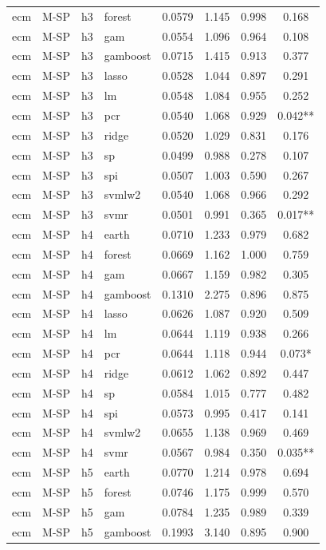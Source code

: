 \begin{ThreePartTable}
\begin{longtable}[t]{llclcccc}
ecm & M-SP & h3 & forest & 0.0579 & 1.145 & 0.998 & 0.168\\
ecm & M-SP & h3 & gam & 0.0554 & 1.096 & 0.964 & 0.108\\
ecm & M-SP & h3 & gamboost & 0.0715 & 1.415 & 0.913 & 0.377\\
ecm & M-SP & h3 & lasso & 0.0528 & 1.044 & 0.897 & 0.291\\
ecm & M-SP & h3 & lm & 0.0548 & 1.084 & 0.955 & 0.252\\
ecm & M-SP & h3 & pcr & 0.0540 & 1.068 & 0.929 & 0.042**\\
ecm & M-SP & h3 & ridge & 0.0520 & 1.029 & 0.831 & 0.176\\
ecm & M-SP & h3 & sp & 0.0499 & 0.988 & 0.278 & 0.107\\
ecm & M-SP & h3 & spi & 0.0507 & 1.003 & 0.590 & 0.267\\
ecm & M-SP & h3 & svmlw2 & 0.0540 & 1.068 & 0.966 & 0.292\\
ecm & M-SP & h3 & svmr & 0.0501 & 0.991 & 0.365 & 0.017**\\
\addlinespace
ecm & M-SP & h4 & earth & 0.0710 & 1.233 & 0.979 & 0.682\\
ecm & M-SP & h4 & forest & 0.0669 & 1.162 & 1.000 & 0.759\\
ecm & M-SP & h4 & gam & 0.0667 & 1.159 & 0.982 & 0.305\\
ecm & M-SP & h4 & gamboost & 0.1310 & 2.275 & 0.896 & 0.875\\
ecm & M-SP & h4 & lasso & 0.0626 & 1.087 & 0.920 & 0.509\\
ecm & M-SP & h4 & lm & 0.0644 & 1.119 & 0.938 & 0.266\\
ecm & M-SP & h4 & pcr & 0.0644 & 1.118 & 0.944 & 0.073*\\
ecm & M-SP & h4 & ridge & 0.0612 & 1.062 & 0.892 & 0.447\\
ecm & M-SP & h4 & sp & 0.0584 & 1.015 & 0.777 & 0.482\\
ecm & M-SP & h4 & spi & 0.0573 & 0.995 & 0.417 & 0.141\\
ecm & M-SP & h4 & svmlw2 & 0.0655 & 1.138 & 0.969 & 0.469\\
ecm & M-SP & h4 & svmr & 0.0567 & 0.984 & 0.350 & 0.035**\\
\addlinespace
ecm & M-SP & h5 & earth & 0.0770 & 1.214 & 0.978 & 0.694\\
ecm & M-SP & h5 & forest & 0.0746 & 1.175 & 0.999 & 0.570\\
ecm & M-SP & h5 & gam & 0.0784 & 1.235 & 0.989 & 0.339\\
ecm & M-SP & h5 & gamboost & 0.1993 & 3.140 & 0.895 & 0.900\\

\end{longtable}
\end{ThreePartTable}
